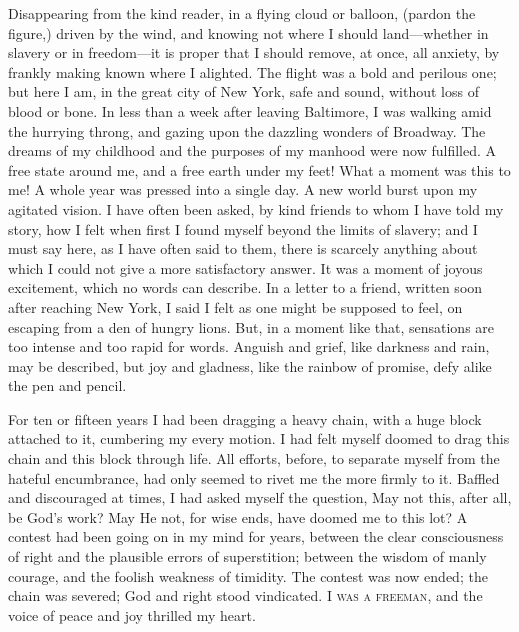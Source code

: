 Disappearing from the kind reader, in a flying cloud or balloon, (pardon
the figure,) driven by the {}wind, and knowing not where I should
land---whether in slavery or in freedom---it is proper that I should
remove, at once, all anxiety, by frankly making known where I alighted.
The flight was a bold and perilous one; but here I am, in the great city
of New York, safe and sound, without loss of blood or bone. In less than
a week after leaving Baltimore, I was walking amid the hurrying throng,
and gazing upon the dazzling wonders of Broadway. The dreams of my
childhood and the purposes of my manhood were now fulfilled. A free
state around me, and a free earth under my feet! What a moment was this
to me! A whole year was pressed into a single day. A new world burst
upon my agitated vision. I have often been asked, by kind friends to
whom I have told my story, how I felt when first I found myself beyond
the limits of slavery; and I must say here, as I have often said to
them, there is scarcely anything about which I could not give a more
satisfactory answer. It was a moment of joyous excitement, which no
words can describe. In a letter to a friend, written soon after reaching
New York, I said I felt as one might be supposed to feel, on escaping
from a den of hungry lions. But, in a moment like that, sensations are
too intense and too rapid for words. Anguish and grief, like darkness
and rain, may be described, but joy and gladness, like the rainbow of
promise, defy alike the pen and pencil.

For ten or fifteen years I had been dragging a heavy chain, with a huge
block attached to it, cumbering my every motion. I had felt myself
doomed {}to drag this chain and this block through life. All efforts,
before, to separate myself from the hateful encumbrance, had only seemed
to rivet me the more firmly to it. Baffled and discouraged at times, I
had asked myself the question, May not this, after all, be God's work?
May He not, for wise ends, have doomed me to this lot? A contest had
been going on in my mind for years, between the clear consciousness of
right and the plausible errors of superstition; between the wisdom of
manly courage, and the foolish weakness of timidity. The contest was now
ended; the chain was severed; God and right stood vindicated. \textsc{I
was a freeman}, and the voice of peace and joy thrilled my heart.

